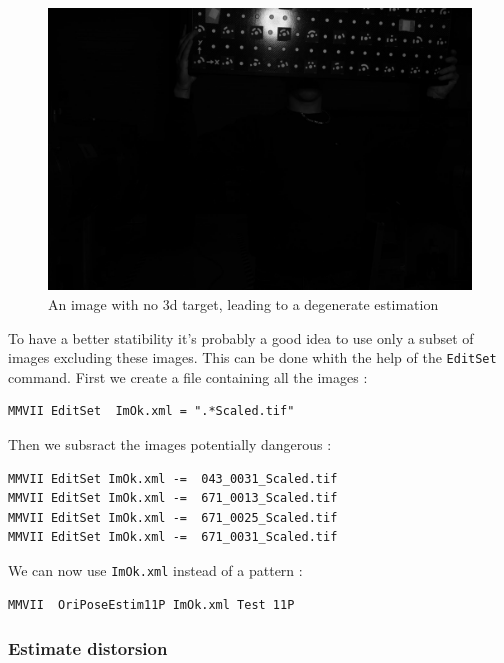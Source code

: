 \begin{figure}
\centering
	\includegraphics[width=12 cm]{Tutorial/Images/ImageBug.jpg}
	\caption{An image with no 3d target, leading to a degenerate estimation}
\label{fig:CodeT:DegenCase}
\end{figure}

To have a better statibility it's probably a good idea to use only a subset of images
excluding these images. This can be done whith the help of the {\tt EditSet} command.  First
we create a file containing all the images :

\begin{lstlisting}
MMVII EditSet  ImOk.xml = ".*Scaled.tif"
\end{lstlisting}

Then we subsract the images potentially dangerous :

\begin{lstlisting}
MMVII EditSet ImOk.xml -=  043_0031_Scaled.tif
MMVII EditSet ImOk.xml -=  671_0013_Scaled.tif
MMVII EditSet ImOk.xml -=  671_0025_Scaled.tif
MMVII EditSet ImOk.xml -=  671_0031_Scaled.tif
\end{lstlisting}

We can now use {\tt ImOk.xml} instead of a pattern :

\begin{lstlisting}
MMVII  OriPoseEstim11P ImOk.xml Test 11P
\end{lstlisting}


\subsubsection{Estimate distorsion}

